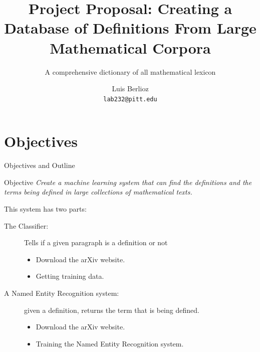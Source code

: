 \documentclass[10pt]{beamer}
\title{Project Proposal: Creating a Database of Definitions From Large Mathematical Corpora}
\subtitle{A comprehensive dictionary of all mathematical lexicon}
\author{Luis Berlioz\\
\texttt{lab232@pitt.edu}}
\institute{University of Pittsburgh}
\begin{document}
\begin{frame}
\titlepage
\end{frame}
\section{Objectives}
\begin{frame}{Objectives and Outline}
    \begin{block}{Objective}
    \textit{Create a machine learning system that can find the definitions and the terms being defined in large collections of mathematical texts. }
    \end{block}


    This system has two parts:
\begin{description}
    \item[The Classifier:] Tells if a given paragraph is a definition or not
        \begin{itemize}
                \item Download the arXiv website.
                \item Getting training data.
        \end{itemize}
    \item[A Named Entity Recognition system:] given a definition, returns the term that is being defined.
        \begin{itemize}
                \item Download the arXiv website.
                \item Training the Named Entity Recognition system.
        \end{itemize}
\end{description}
\end{frame}
\end{document}

